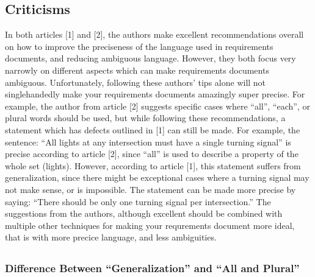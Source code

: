 \documentclass[letterpaper,12pt]{article}
\begin{document}
\subsection{Criticisms} %
In both articles [1] and [2], the authors make excellent recommendations overall
on how to improve the preciseness of the language used in requirements
documents, and reducing ambiguous language. However, they both focus very
narrowly on different aspects which can make requirements documents ambiguous.
Unfortunately, following these authors' tips alone will not singlehandedly make
your requirements documents amazingly super precise. For example, the author
from article [2] suggests specific cases where ``all'', ``each'', or plural
words should be used, but while following these recommendations, a statement
which has defects outlined in [1] can still be made. For example, the sentence:
``All lights at any intersection must have a single turning signal'' is precise
according to article [2], since ``all'' is used to describe a property of the
whole set (lights). However, according to article [1], this statement suffers
from generalization, since there might be exceptional cases where a turning
signal may not make sense, or is impossible. The statement can be made more
precise by saying: ``There should be only one turning signal per intersection.''
The suggestions from the authors, although excellent should be combined with
multiple other techniques for making your requrements document more ideal, that
is with more precice language, and less ambiguities.

\subsection{}

\subsubsection{Difference Between ``Generalization'' and ``All and Plural''}
\end{document}
